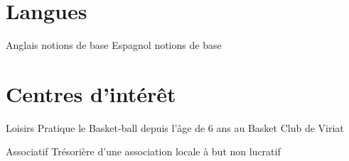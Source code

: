 \documentclass[10pt,a4paper,sans]{moderncv}
\begin{document}
\section{Langues}

\cvcomputer
	{Anglais}
	{notions de base}
	{Espagnol}
	{notions de base}



\section{Centres d'intérêt}

\cvline
	{Loisirs}
	{Pratique le Basket-ball depuis l'âge de 6 ans au Basket Club de Viriat}

\cvline
	{Associatif}
	{Trésorière d'une association locale à but non lucratif}

\end{document}
